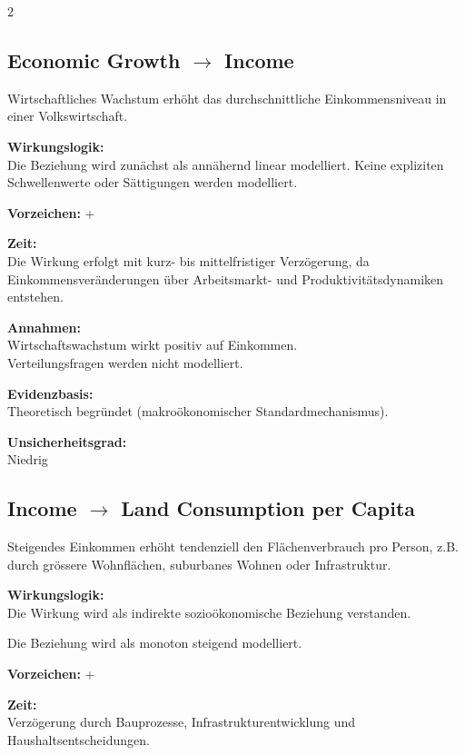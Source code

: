 \documentclass[10pt, a4paper]{article}
\begin{document}
\begin{multicols}{2}

\subsection*{Economic Growth $\rightarrow$ Income}
Wirtschaftliches Wachstum erhöht das durchschnittliche Einkommensniveau in einer Volkswirtschaft. 

\textbf{Wirkungslogik:}\\
Die Beziehung wird zunächst als annähernd linear modelliert. Keine expliziten Schwellenwerte oder Sättigungen werden modelliert.

\textbf{Vorzeichen:} +

\textbf{Zeit:}\\
Die Wirkung erfolgt mit kurz- bis mittelfristiger Verzögerung, da Einkommensveränderungen über Arbeitsmarkt- und Produktivitätsdynamiken entstehen.

\textbf{Annahmen:}\\
Wirtschaftswachstum wirkt positiv auf Einkommen.\\
Verteilungsfragen werden nicht modelliert.

\textbf{Evidenzbasis:}\\
Theoretisch begründet (makroökonomischer Standardmechanismus).

\textbf{Unsicherheitsgrad:}\\
Niedrig

\vspace{0.5cm} %

\subsection*{Income $\rightarrow$ Land Consumption per Capita}
Steigendes Einkommen erhöht tendenziell den Flächenverbrauch pro Person, z.B. durch grössere Wohnflächen, suburbanes Wohnen oder Infrastruktur.

\textbf{Wirkungslogik:}\\
Die Wirkung wird als indirekte sozioökonomische Beziehung verstanden.

Die Beziehung wird als monoton steigend modelliert.

\textbf{Vorzeichen:} +

\textbf{Zeit:}\\
Verzögerung durch Bauprozesse, Infrastrukturentwicklung und Haushaltsentscheidungen.


\end{multicols}
\end{document}
